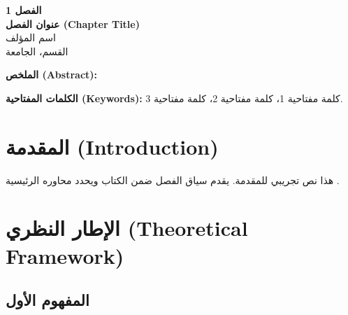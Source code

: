 \documentclass[11pt,a4paper]{article}
\newcommand{\chapternumber}{1}
\newcommand{\chaptertitle}{عنوان الفصل (Chapter Title)}
\begin{document}
\thispagestyle{fancy}

\begin{center}
{\Large\bfseries الفصل \chapternumber}\\[0.8em]
{\LARGE\bfseries \chaptertitle}\\[1em]
{\large اسم المؤلف}\\[0.3em]
{\small القسم، الجامعة}
\end{center}

\vspace{1em}

\begin{center}
\begin{minipage}{0.9\textwidth}
\noindent\textbf{الملخص (Abstract):}

\vspace{0.5em}
\noindent\textbf{الكلمات المفتاحية (Keywords):} كلمة مفتاحية 1، كلمة مفتاحية 2، كلمة مفتاحية 3.
\end{minipage}
\end{center}

\vspace{1em}


\section{المقدمة (Introduction)}
\label{sec:intro}

هذا نص تجريبي للمقدمة. يقدم سياق الفصل ضمن الكتاب ويحدد محاوره الرئيسية \cite{example_book}.

\section{الإطار النظري (Theoretical Framework)}
\label{sec:theory}

\subsection{المفهوم الأول}
\end{document}
